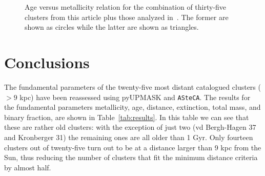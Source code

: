\documentclass[referee]{aa}
\begin{document}
  \begin{figure}
   \caption{Age versus metallicity relation for the combination of thirty-five
   clusters from this article plus those analyzed in~\cite{Perren_2020}. The
   former are shown as circles while the latter are shown as triangles.}
   \label{fig:age_vs_feh}
  \end{figure}








\section{Conclusions}
 \label{sec:conclusions}

  The fundamental parameters of the twenty-five most distant catalogued clusters
  ($>9$ kpc) have been reassessed using pyUPMASK and \texttt{ASteCA}. The
  results for the fundamental parameters metallicity, age, distance,
  extinction, total mass, and binary fraction, are shown in 
  Table~\ref{tab:results}. In this table we can see that these are
  rather old clusters: with the exception of just two (vd Bergh-Hagen 37 and
  Kronberger 31) the remaining ones are all older than 1 Gyr.
  Only fourteen clusters out of twenty-five turn out to be at a distance larger
  than 9 kpc from the Sun, thus reducing the number of clusters that fit the
  minimum distance criteria by almost half.
\end{document}
